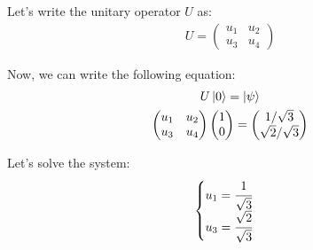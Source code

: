 \documentclass[12pt]{article}
\begin{document}
\begin{itemize}
Let's write the unitary operator $U$ as:
\begin{gather*}
    U = 
    \begin{pmatrix}
        u_1 & u_2 \\ u_3 & u_4
    \end{pmatrix}
\end{gather*}

Now, we can write the following equation:
\begin{gather*}
    U \ket 0 = \ket \psi \\
    \begin{pmatrix}
        u_1 & u_2 \\ u_3 & u_4
    \end{pmatrix}
    \begin{pmatrix}
        1 \\ 0
    \end{pmatrix}
    =
    \begin{pmatrix}
        1/\sqrt{3} \\ \sqrt{2}/\sqrt{3}
    \end{pmatrix}
\end{gather*}

Let's solve the system:
\begin{gather*}
    \begin{cases}
        u_1 = \cfrac{1}{\sqrt{3}} \\
        u_3 = \cfrac{\sqrt{2}}{\sqrt{3}}
    \end{cases}
\end{gather*}


\end{itemize}
\end{document}
